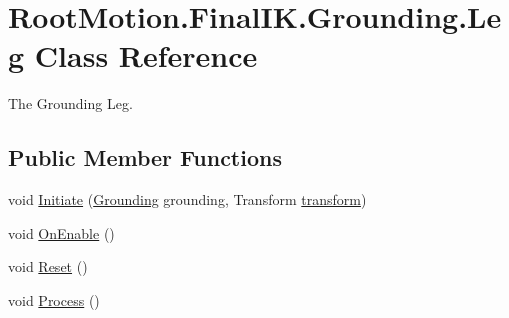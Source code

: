 \hypertarget{class_root_motion_1_1_final_i_k_1_1_grounding_1_1_leg}{}\section{Root\+Motion.\+Final\+I\+K.\+Grounding.\+Leg Class Reference}
\label{class_root_motion_1_1_final_i_k_1_1_grounding_1_1_leg}


The Grounding Leg.  


\subsection*{Public Member Functions}
\begin{DoxyCompactItemize}
\item 
void \mbox{\hyperlink{class_root_motion_1_1_final_i_k_1_1_grounding_1_1_leg_a1ea1d3afdd6c9e51affa834d3e9f2e16}{Initiate}} (\mbox{\hyperlink{class_root_motion_1_1_final_i_k_1_1_grounding}{Grounding}} grounding, Transform \mbox{\hyperlink{class_root_motion_1_1_final_i_k_1_1_grounding_1_1_leg_a97117a5b07d03252a6888dd710c30ea2}{transform}})
\item 
void \mbox{\hyperlink{class_root_motion_1_1_final_i_k_1_1_grounding_1_1_leg_a0398dfc94cfdcc78ff47d893aa822f1a}{On\+Enable}} ()
\item 
void \mbox{\hyperlink{class_root_motion_1_1_final_i_k_1_1_grounding_1_1_leg_ad063be5bc5adb8de010240d8cce46119}{Reset}} ()
\item 
void \mbox{\hyperlink{class_root_motion_1_1_final_i_k_1_1_grounding_1_1_leg_adb36d2033a573bb331fee5dbb6162692}{Process}} ()
\end{DoxyCompactItemize}
